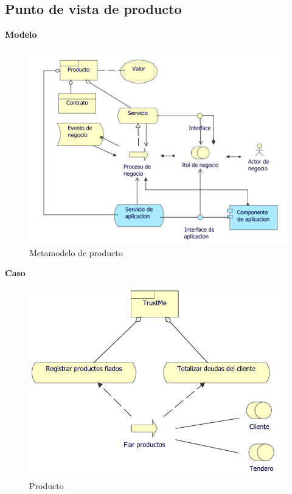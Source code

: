 	\subsection{Punto de vista de producto}
	{
		
		\textbf{Modelo}\\
		\begin{figure}[H]
			\centering
			\includegraphics[width=0.8\linewidth]{development/producto.png}
			\caption{Metamodelo de producto}
		\end{figure}
		
		\textbf{Caso}\\
	
		
		\begin{figure}[H]
			\centering
			\includegraphics[width=0.8\linewidth]{development/producto.pdf}
			\caption{Producto}
		\end{figure}
	}